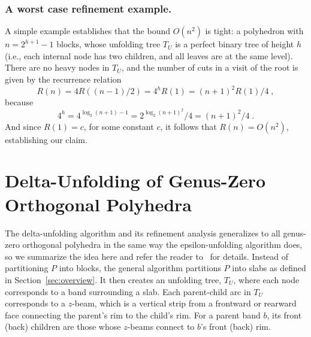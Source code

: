 \documentclass[11pt]{article}
\begin{document}
\subsubsection{A worst case refinement example.}
A simple example establishes that the bound $O(n^2)$ is tight: a
polyhedron with $n = 2^{h+1}-1$ blocks,
whose unfolding tree $T_U$ is a perfect
binary tree of height $h$ (i.e., each internal node has two children, and all
leaves are at the same level).
There are no heavy nodes in $T_U$, and the number of cuts in a visit of
the root is given by the recurrence relation
$$
R(n)=4R((n-1)/2) = 4^{h}R(1) = (n+1)^2R(1)/4
\;,
$$
because
$$
4^h = 4^{\log_2(n+1) - 1} = 2^{\log_2(n+1)^2} /4 = (n+1)^2/4
\;.
$$
And since $R(1) = c$, for some constant $c$, it follows that $R(n) =
O(n^2)$,
establishing our claim.

\section{Delta-Unfolding of Genus-Zero Orthogonal Polyhedra}
\label{Delta-Unfolding of Genus-Zero Orthogonal Polyhedra}

The delta-unfolding algorithm and its refinement analysis
generalizes to all genus-zero orthogonal polyhedra in the same
way the epsilon-unfolding algorithm does, so we summarize the idea here and refer the
reader to~\cite{Damian-Flatland-O'Rourke-2007-epsilon} for details. Instead of partitioning $P$ into blocks, the general algorithm
partitions $P$ into slabs as defined in Section~\ref{sec:overview}.
It then creates an unfolding tree, $T_U$, where each node corresponds to a band surrounding a slab.
Each parent-child arc in $T_U$ corresponds to a $z$-beam, which is a vertical strip from a frontward or rearward face connecting the parent's rim to the child's rim.
For a parent band $b$, its front (back) children are those
whose $z$-beams connect to $b$'s front (back) rim.
\end{document}

